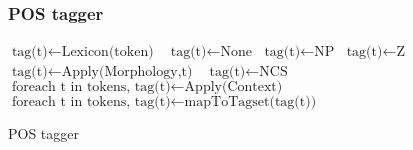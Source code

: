 \documentclass{beamer}
\begin{document}
\begin{frame}
\frametitle{POS tagger}
\begin{algorithm}[H]
\begin{scriptsize}\fontsize{7}{8}\selectfont
    \begin{algorithmic}[1]
	 	 $\text{tag(t)} \gets \text{Lexicon(token)}$ \Else $\text{ tag(t)}  \gets \text{None}$ \EndIf 
            \EndFor   
      $\text{tag(t)} \gets \text{NP}$  $\text{tag(t)} \gets \text{Z}$  $\text{tag(t)} \gets \text{Apply(Morphology,t)}$ 
     \Else $ \text{ tag(t)} \gets \text{NCS}$ \EndIf 
    \EndFor 
      $\text{foreach t in tokens, tag(t)} \gets \text{Apply(Context)}$ \EndIf  
      $\text{foreach t in tokens, tag(t)} \gets \text{mapToTagset(tag(t))}$ \EndIf       
        \EndProcedure
    \end{algorithmic}
    \label{alg:rAP}
    \caption{POS tagger}
    \end{scriptsize}
\end{algorithm}
\end{frame}
\end{document}
